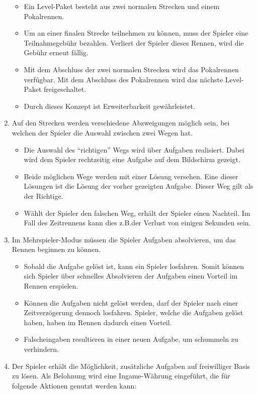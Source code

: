 \begin{enumerate}
		\begin{itemize}
			\item{Ein Level-Paket besteht aus zwei normalen Strecken und einem Pokalrennen.}
			\item{Um an einer finalen Strecke teilnehmen zu können, muss der Spieler eine Teilnahmegebühr bezahlen. Verliert der Spieler dieses Rennen, wird die Gebühr erneut fällig.}
			\item{Mit dem Abschluss der zwei normalen Strecken wird das Pokalrennen verfügbar. Mit dem Abschluss des Pokalrennen wird das nächste Level-Paket freigeschaltet.}
			\item{Durch dieses Konzept ist Erweiterbarkeit gewährleistet.}
		\end{itemize}
		\item{Auf den Strecken werden verschiedene Abzweigungen möglich sein, bei welchen der Spieler die Auswahl zwischen zwei Wegen hat.}
		\begin{itemize}
			\item{Die Auswahl des \enquote{richtigen} Wegs wird über Aufgaben realisiert. Dabei wird dem Spieler rechtzeitig eine Aufgabe auf dem Bildschirm gezeigt.}
			\item{Beide möglichen Wege werden mit einer Lösung versehen. Eine dieser Lösungen ist die Lösung der vorher gezeigten Aufgabe. Dieser Weg gilt als der Richtige.}
			\item{Wählt der Spieler den falschen Weg, erhält der Spieler einen Nachteil. Im Fall des Zeitrennens kann dies z.B.\@ der Verlust von einigen Sekunden sein.}
		\end{itemize}
		\item{Im Mehrspieler-Modus müssen die Spieler Aufgaben absolvieren, um das Rennen beginnen zu können.}
			\begin{itemize}
				\item{Sobald die Aufgabe gelöst ist, kann ein Spieler losfahren. Somit können sich Spieler über schnelles Absolvieren der Aufgaben einen Vorteil im Rennen erspielen.}
				\item{Können die Aufgaben nicht gelöst werden, darf der Spieler nach einer Zeitverzögerung dennoch losfahren. Spieler, welche die Aufgaben gelöst haben, haben im Rennen dadurch einen Vorteil.}
				\item{Falscheingaben resultieren in einer neuen Aufgabe, um schummeln zu verhindern.}
			\end{itemize}
		\item{Der Spieler erhält die Möglichkeit, zusätzliche Aufgaben auf freiwilliger Basis zu lösen. Als Belohnung wird eine Ingame-Währung eingeführt, die für folgende Aktionen genutzt werden kann:}

\end{enumerate}

